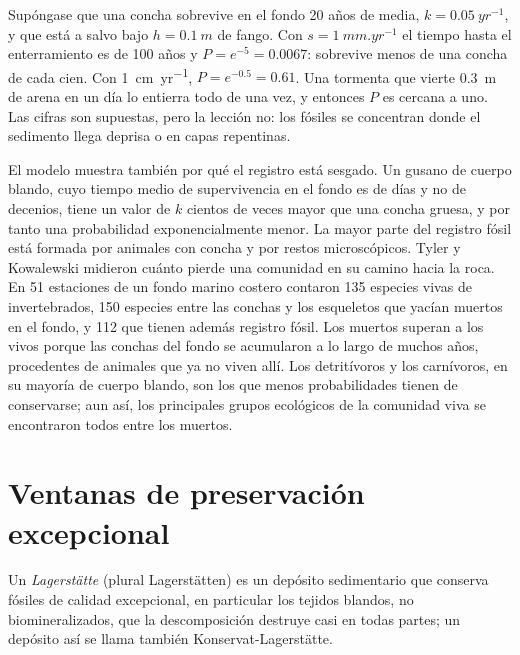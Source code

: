 \begin{example}\label{ex:b2:palaeoenvironments:shell}
Supóngase que una concha sobrevive en el fondo 20 años de media, $k = \qty{0.05}{yr^{-1}}$, y que está
a salvo bajo $h = \qty{0.1}{m}$ de fango. Con $s = \qty{1}{mm.yr^{-1}}$ el tiempo hasta el enterramiento es de 100
años y $P = e^{-5} = 0.0067$: sobrevive menos de una concha de cada cien. Con
\qty{1}{cm.yr^{-1}}, $P = e^{-0.5} = 0.61$. Una tormenta que vierte \qty{0.3}{m} de arena en un día
lo entierra todo de una vez, y entonces $P$ es cercana a uno. Las cifras son supuestas, pero la lección
no: los fósiles se concentran donde el sedimento llega deprisa o en capas repentinas.
\end{example}

El modelo muestra también por qué el registro está sesgado. Un gusano de cuerpo blando, cuyo tiempo medio de supervivencia en
el fondo es de días y no de decenios, tiene un valor de $k$ cientos de veces mayor que una concha
gruesa, y por tanto una probabilidad exponencialmente menor. La mayor parte del registro fósil está formada por animales
con concha y por restos microscópicos. Tyler y Kowalewski midieron cuánto pierde una comunidad en
su camino hacia la roca. En 51 estaciones de un fondo marino costero contaron 135 especies vivas de
invertebrados, 150 especies entre las conchas y los esqueletos que yacían muertos en el fondo, y 112 que
tienen además registro fósil. Los muertos superan a los vivos porque las conchas del fondo se acumularon
a lo largo de muchos años, procedentes de animales que ya no viven allí. Los detritívoros y los carnívoros, en su mayoría
de cuerpo blando, son los que menos probabilidades tienen de conservarse; aun así, los principales grupos ecológicos de la
comunidad viva se encontraron todos entre los muertos.

\section{Ventanas de preservación excepcional}\label{sec:b2:palaeoenvironments:lagerstatten}

\begin{definition}[Lagerstätte]\label{def:b2:palaeoenvironments:lagerstatte}
Un \emph{Lagerstätte} (plural Lagerstätten) es un depósito sedimentario que
conserva fósiles de calidad excepcional, en particular los tejidos blandos, no biomineralizados, que
la descomposición destruye casi en todas partes; un depósito así se llama también Konservat-Lagerstätte.
\end{definition}

